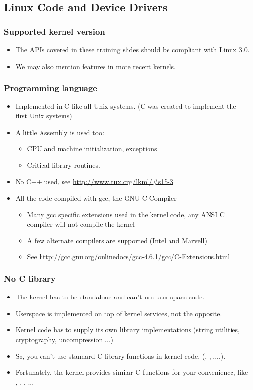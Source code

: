 \subsection{Linux Code and Device Drivers}

\begin{frame}
  \frametitle{Supported kernel version}
  \begin{itemize}
  \item The APIs covered in these training slides should be compliant
    with Linux 3.0.
  \item We may also mention features in more recent kernels.
  \end{itemize}
\end{frame}


\begin{frame}
  \frametitle{Programming language}
  \begin{itemize}
  \item Implemented in C like all Unix systems. (C was created to
    implement the first Unix systems)
  \item A little Assembly is used too:
    \begin{itemize}
    \item CPU and machine initialization, exceptions
    \item Critical library routines.
    \end{itemize}
  \item No C++ used, see \url{http://www.tux.org/lkml/\#s15-3}
  \item All the code compiled with gcc, the GNU C Compiler
    \begin{itemize}
    \item Many gcc specific extensions used in the kernel code, any
      ANSI C compiler will not compile the kernel
    \item A few alternate compilers are supported (Intel and Marvell)
    \item See
      \url{http://gcc.gnu.org/onlinedocs/gcc-4.6.1/gcc/C-Extensions.html}
    \end{itemize}
  \end{itemize}
\end{frame}

\begin{frame}
  \frametitle{No C library}
  \begin{itemize}
  \item The kernel has to be standalone and can't use user-space code.
  \item Userspace is implemented on top of kernel services, not the
    opposite.
  \item Kernel code has to supply its own library implementations
    (string utilities, cryptography, uncompression ...)
  \item So, you can't use standard C library functions in kernel code.
    (, , ,...).
  \item Fortunately, the kernel provides similar C functions for your
    convenience, like , ,
    , ...
  \end{itemize}
\end{frame}

